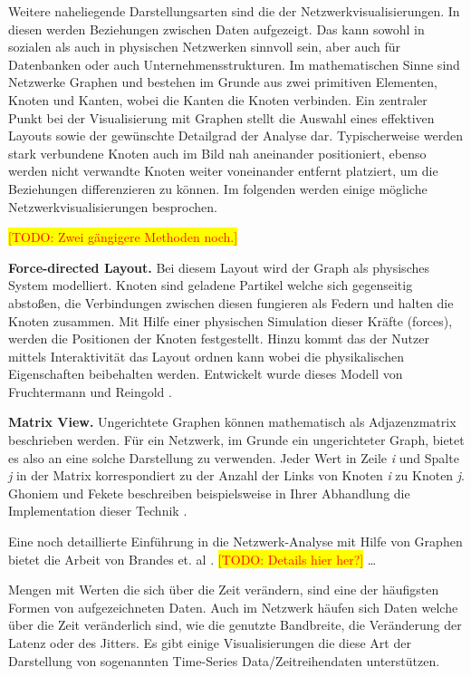 \documentclass[draft=false
              ,paper=a4
              ,twoside=false
              ,fontsize=11pt
              ,headsepline
              ,BCOR10mm
              ,DIV11
              ]{scrbook}
\newcommand{\TODO}[1]{\colorbox{yellow}{\textcolor{red}{[TODO: #1]}}}
\begin{document}
Weitere naheliegende Darstellungsarten sind die der Netzwerkvisualisierungen. In diesen werden Beziehungen zwischen Daten aufgezeigt. Das kann sowohl in sozialen als auch in physischen Netzwerken sinnvoll sein, aber auch für Datenbanken oder auch Unternehmensstrukturen. Im mathematischen Sinne sind Netzwerke Graphen und bestehen im Grunde aus zwei primitiven Elementen, Knoten und Kanten, wobei die Kanten die Knoten verbinden. Ein zentraler Punkt bei der Visualisierung mit Graphen stellt die Auswahl eines effektiven Layouts sowie der gewünschte Detailgrad der Analyse dar. Typischerweise werden stark verbundene Knoten auch im Bild nah aneinander positioniert, ebenso werden nicht verwandte Knoten weiter voneinander entfernt platziert, um die Beziehungen differenzieren zu können. Im folgenden werden einige mögliche Netzwerkvisualisierungen besprochen.

\TODO{Zwei gängigere Methoden noch.}

\textbf{Force-directed Layout.}  Bei diesem Layout wird der Graph als physisches System modelliert. Knoten sind geladene Partikel welche sich gegenseitig abstoßen, die Verbindungen zwischen diesen fungieren als Federn und halten die Knoten zusammen. Mit Hilfe einer physischen Simulation dieser Kräfte (forces), werden die Positionen der Knoten festgestellt. Hinzu kommt das der Nutzer mittels Interaktivität das Layout ordnen kann wobei die physikalischen Eigenschaften beibehalten werden. Entwickelt wurde dieses Modell von Fruchtermann und Reingold \cite{Fruchterman91graphdrawing}. 

\textbf{Matrix View.} Ungerichtete Graphen können mathematisch als Adjazenzmatrix beschrieben werden. Für ein Netzwerk, im Grunde ein ungerichteter Graph, bietet es also an eine solche Darstellung zu verwenden. Jeder Wert in Zeile \textit{i} und Spalte \textit{j} in der Matrix korrespondiert zu der Anzahl der Links von Knoten \textit{i} zu Knoten \textit{j}. Ghoniem und Fekete beschreiben beispielsweise in Ihrer Abhandlung die Implementation dieser Technik \cite{Ghoniem:2003:MVG:1063669.1063698}.

Eine noch detaillierte Einführung in die Netzwerk-Analyse mit Hilfe von Graphen bietet die Arbeit von Brandes et. al \cite{brandes2005network}. \TODO{Details hier her?}
\ldots

Mengen mit Werten die sich über die Zeit verändern, sind eine der häufigsten Formen von aufgezeichneten Daten. Auch im Netzwerk häufen sich Daten welche über die Zeit veränderlich sind, wie die genutzte Bandbreite, die Veränderung der Latenz oder des Jitters. Es gibt einige Visualisierungen die diese Art der Darstellung von sogenannten Time-Series Data/Zeitreihendaten unterstützen. 
\end{document}
